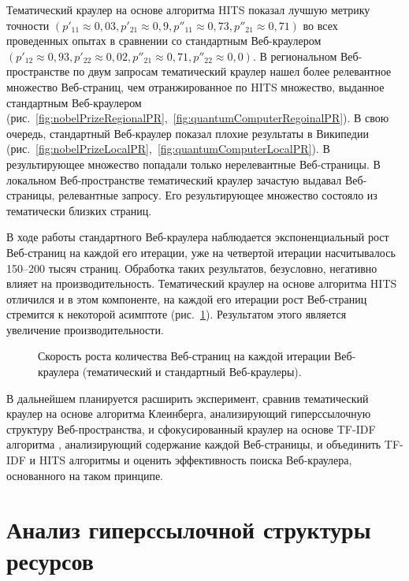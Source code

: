 Тематический краулер на основе алгоритма HITS показал лучшую метрику точности \((p'_{11} \approx 0,03, p'_{21} \approx 0,9, p''_{11} \approx 0,73, p''_{21} \approx 0,71)\) во всех проведенных опытах в сравнении со стандартным Веб-краулером \((p'_{12} \approx 0,93, p'_{22} \approx 0,02, p''_{21} \approx 0,71, p''_{22} \approx 0,0)\). В региональном Веб-пространстве по двум запросам тематический краулер нашел более релевантное множество Веб-страниц, чем отранжированное по HITS множество, выданное стандартным Веб-краулером (рис.~\cref{fig:nobelPrizeRegionalPR},~\cref{fig:quantumComputerRegoinalPR}). В свою очередь, стандартный Веб-краулер показал плохие результаты в Википедии (рис.~\cref{fig:nobelPrizeLocalPR},~\cref{fig:quantumComputerLocalPR}). В результирующее множество попадали только нерелевантные Веб-страницы. В локальном Веб-пространстве тематический краулер зачастую выдавал Веб-страницы, релевантные запросу. Его результирующее множество состояло из тематически близких страниц.

В ходе работы стандартного Веб-краулера наблюдается экспоненциальный рост Веб-страниц на каждой его итерации, уже на четвертой итерации насчитывалось 150–200 тысяч страниц. Обработка таких результатов, безусловно, негативно влияет на производительность. Тематический краулер на основе алгоритма HITS отличился и в этом компоненте, на каждой его итерации рост Веб-страниц стремится к некоторой асимптоте (рис.~\cref{fig:crawlerIterationSpeed}). Результатом этого является увеличение производительности.

\begin{figure}[ht]
	\caption{Скорость роста количества Веб-страниц на каждой итерации Веб-краулера (тематический и стандартный Веб-краулеры).}\label{fig:crawlerIterationSpeed}
\end{figure}

В дальнейшем планируется расширить эксперимент, сравнив тематический краулер на основе алгоритма Клеинберга, анализирующий гиперссылочную структуру Веб-пространства, и сфокусированный краулер на основе TF-IDF алгоритма \cite{ManningRaghavanSchutze}, анализирующий содержание каждой Веб-страницы, и объединить TF-IDF и HITS алгоритмы и оценить эффективность поиска Веб-краулера, основанного на таком принципе.

\section{Анализ гиперссылочной структуры ресурсов}\label{sec:ch1/sec4}

